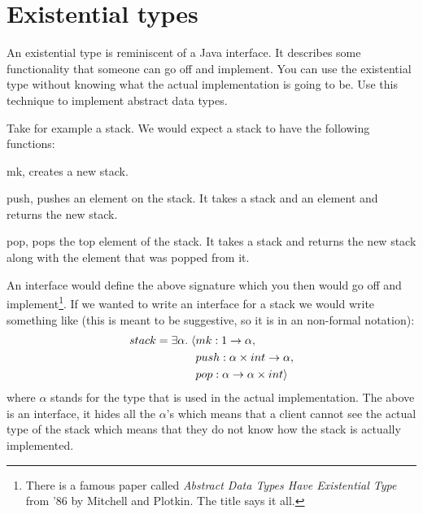 \section*{Existential types}
An existential type is reminiscent of a Java interface. It describes some functionality that someone can go off and implement. You can use the existential type without knowing what the actual implementation is going to be. Use this technique to implement abstract data types.

Take for example a stack. We would expect a stack to have the following functions:
\begin{description}
  \item{mk}, creates a new stack.
  \item{push}, pushes an element on the stack. It takes a stack and an element and returns the new stack.
  \item{pop}, pops the top element of the stack. It takes a stack and returns the new stack along with the element that was popped from it.
\end{description}
An interface would define the above signature which you then would go off and implement\footnote{There is a famous paper called \emph{Abstract Data Types Have Existential Type} from '86 by Mitchell and Plotkin. The title says it all.}. If we wanted to write an interface for a stack we would write something like (this is meant to be suggestive, so it is in an non-formal notation):
\begin{align*}
  stack = \exists \alpha.\; \langle & mk:  1 \rightarrow \alpha, \\
                                 & push:  \alpha \times int \rightarrow \alpha, \\
                                 & pop:  \alpha \rightarrow \alpha \times int \rangle
\end{align*}
where $\alpha$ stands for the type that is used in the actual implementation. The above is an interface, it hides all the $\alpha$'s which means that a client cannot see the actual type of the stack which means that they do not know how the stack is actually implemented.

